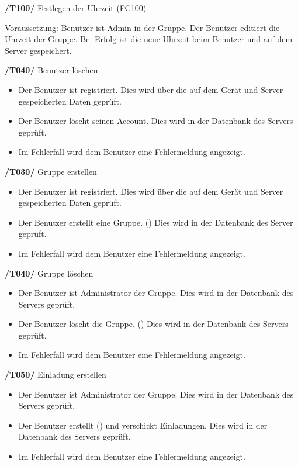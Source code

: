 \begin{itemize}
\begin{itemize}
\textbf{/T100/} Festlegen der Uhrzeit (FC100)\\
\begin{itemize}
Voraussetzung: Benutzer ist Admin in der Gruppe.
Der Benutzer editiert die Uhrzeit der Gruppe.
Bei Erfolg ist die neue Uhrzeit beim Benutzer und auf dem Server gespeichert.
\end{itemize}




\textbf{/T040/} Benutzer löschen \\
\begin{itemize}
\setlength{\itemsep}{0pt}
\item Der Benutzer ist registriert. Dies wird über die auf dem Gerät
und Server gespeicherten Daten geprüft.
\item Der Benutzer löscht seinen Account. Dies wird in der Datenbank des Servers geprüft.
\item Im Fehlerfall wird dem Benutzer eine Fehlermeldung angezeigt.
\end{itemize}

\textbf{/T030/} Gruppe erstellen \\
\begin{itemize}
\setlength{\itemsep}{0pt}
\item Der Benutzer ist registriert. Dies wird über die auf dem Gerät
und Server gespeicherten Daten geprüft.
\item Der Benutzer erstellt eine Gruppe. () Dies wird in der Datenbank des Server geprüft.
\item Im Fehlerfall wird dem Benutzer eine Fehlermeldung angezeigt.
\end{itemize}

\textbf{/T040/} Gruppe löschen \\
\begin{itemize}
\setlength{\itemsep}{0pt}
\item Der Benutzer ist Administrator der Gruppe. Dies wird in der Datenbank des Servers geprüft.
\item Der Benutzer löscht die Gruppe. () Dies wird in der Datenbank des Servers geprüft.
\item Im Fehlerfall wird dem Benutzer eine Fehlermeldung angezeigt.
\end{itemize}

\textbf{/T050/} Einladung erstellen \\
\begin{itemize}
\setlength{\itemsep}{0pt}
\item Der Benutzer ist Administrator der Gruppe. Dies wird in der Datenbank des Servers geprüft.
\item Der Benutzer erstellt () und verschickt Einladungen. Dies wird in der Datenbank des Servers geprüft.
\item Im Fehlerfall wird dem Benutzer eine Fehlermeldung angezeigt.
\end{itemize}



\end{itemize}
\end{itemize}
